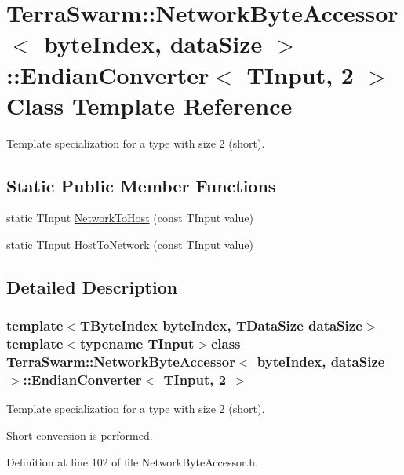 \hypertarget{class_terra_swarm_1_1_network_byte_accessor_1_1_endian_converter_3_01_t_input_00_012_01_4}{\section{Terra\-Swarm\-:\-:Network\-Byte\-Accessor$<$ byte\-Index, data\-Size $>$\-:\-:Endian\-Converter$<$ T\-Input, 2 $>$ Class Template Reference}
\label{class_terra_swarm_1_1_network_byte_accessor_1_1_endian_converter_3_01_t_input_00_012_01_4}
}


Template specialization for a type with size 2 (short).  


\subsection*{Static Public Member Functions}
\begin{DoxyCompactItemize}
\item 
static T\-Input \hyperlink{class_terra_swarm_1_1_network_byte_accessor_1_1_endian_converter_3_01_t_input_00_012_01_4_a595e5e26bf4e3360e6d7136dce04cee0}{Network\-To\-Host} (const T\-Input value)
\item 
static T\-Input \hyperlink{class_terra_swarm_1_1_network_byte_accessor_1_1_endian_converter_3_01_t_input_00_012_01_4_a84a61b152631ff4c071405f984f37398}{Host\-To\-Network} (const T\-Input value)
\end{DoxyCompactItemize}


\subsection{Detailed Description}
\subsubsection*{template$<$T\-Byte\-Index byte\-Index, T\-Data\-Size data\-Size$>$template$<$typename T\-Input$>$class Terra\-Swarm\-::\-Network\-Byte\-Accessor$<$ byte\-Index, data\-Size $>$\-::\-Endian\-Converter$<$ T\-Input, 2 $>$}

Template specialization for a type with size 2 (short). 

Short conversion is performed. 

Definition at line 102 of file Network\-Byte\-Accessor.\-h.



